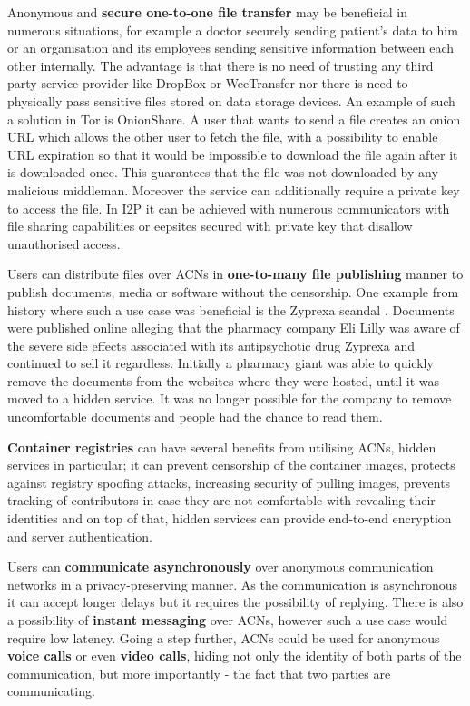 Anonymous and \textbf{secure one-to-one file transfer} may be beneficial in numerous situations, for example a doctor securely sending patient’s data to him or an organisation and its employees sending sensitive information between each other internally. The advantage is that there is no need of trusting any third party service provider like DropBox or WeeTransfer nor there is need to physically pass sensitive files stored on data storage devices.
An example of such a solution in Tor is OnionShare. A user that wants to send a file creates an onion URL which allows the other user to fetch the file, with a possibility to enable URL expiration so that it would be impossible to download the file again after it is downloaded once. This guarantees that the file was not downloaded by any malicious middleman. Moreover the service can additionally require a private key to access the file. In I2P it can be achieved with numerous communicators with file sharing capabilities or eepsites secured with private key that disallow unauthorised access.

Users can distribute files over ACNs in \textbf{one-to-many file publishing} manner to publish documents, media or software without the censorship. One example from history where such a use case was beneficial is the Zyprexa scandal \cite{zyprexa}. Documents were published online alleging that the pharmacy company Eli Lilly was aware of the severe side effects associated with its antipsychotic drug Zyprexa and continued to sell it regardless. Initially a pharmacy giant was able to quickly remove the documents from the websites where they were hosted, until it was moved to a hidden service. It was no longer possible for the company to remove uncomfortable documents and people had the chance to read them.

\textbf{Container registries} can have several benefits from utilising ACNs, hidden services in particular; it can prevent censorship of the container images, protects against registry spoofing attacks, increasing security of pulling images, prevents tracking of contributors in case they are not comfortable with revealing their identities and on top of that, hidden services can provide end-to-end encryption and server authentication.

Users can \textbf{communicate asynchronously} over anonymous communication networks in a privacy-preserving manner. As the communication is asynchronous it can accept longer delays but it requires the possibility of replying. There is also a possibility of \textbf{instant messaging} over ACNs, however such a use case would require low latency. Going a step further, ACNs could be used for anonymous \textbf{voice calls} or even \textbf{video calls}, hiding not only the identity of both parts of the communication, but more importantly - the fact that two parties are communicating.

